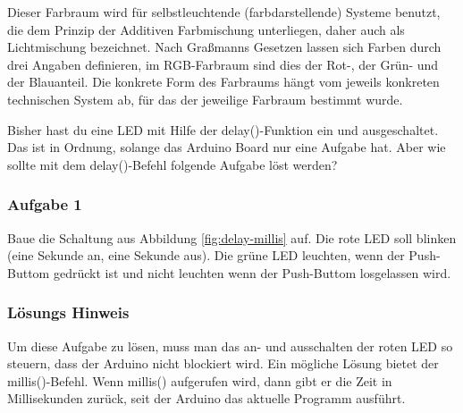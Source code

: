 Dieser Farbraum wird für selbstleuchtende (farbdarstellende) Systeme benutzt, die dem Prinzip der Additiven Farbmischung unterliegen, daher auch als Lichtmischung bezeichnet. Nach Graßmanns Gesetzen lassen sich Farben durch drei Angaben definieren, im RGB-Farbraum sind dies der Rot-, der Grün- und der Blauanteil. Die konkrete Form des Farbraums hängt vom jeweils konkreten technischen System ab, für das der jeweilige Farbraum bestimmt wurde.





\label{sec:millis}
Bisher hast du eine LED mit Hilfe der delay()-Funktion ein und ausgeschaltet. Das ist in Ordnung,  solange das Arduino Board nur eine Aufgabe hat. Aber wie sollte mit dem delay()-Befehl folgende Aufgabe löst werden?

\subsubsection{Aufgabe 1}

Baue die Schaltung aus Abbildung \ref{fig:delay-millis} auf. Die rote LED soll blinken (eine Sekunde an, eine Sekunde aus). Die grüne LED leuchten, wenn der Push-Buttom gedrückt ist und nicht leuchten wenn der Push-Buttom losgelassen wird.


\subsubsection{Lösungs Hinweis}
Um diese Aufgabe zu lösen, muss man das an- und ausschalten der roten LED so steuern, dass der Arduino nicht blockiert wird. Ein mögliche Lösung bietet der millis()-Befehl. Wenn millis() aufgerufen wird, dann gibt er die Zeit in Millisekunden zurück, seit der Arduino das aktuelle Programm ausführt. 

